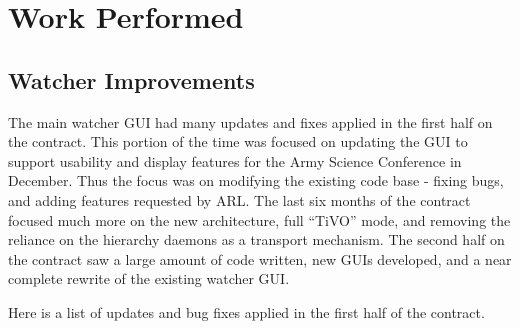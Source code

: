 \documentclass{report}
\begin{document}
\section{Work Performed}

\subsection{Watcher Improvements}
The main watcher GUI had many updates and fixes applied in the first half on the contract. This portion of the time was focused on updating the GUI to 
support usability and display features for the Army Science Conference in December. Thus the focus was on modifying the existing code base - fixing bugs, 
and adding features requested by ARL. The last six months of the contract focused much more on the new architecture, full ``TiVO'' mode, and removing 
the reliance on the hierarchy daemons as a transport mechanism. The second half on the contract saw a large amount of code written, new GUIs developed, and 
a near complete rewrite of the existing watcher GUI. 

Here is a list of updates and bug fixes applied in the first half of the contract.
\end{document}
